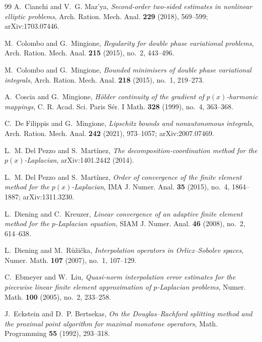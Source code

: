\documentclass[11pt]{amsart}
\theoremstyle{definition}
\theoremstyle{remark}
\numberwithin{equation}{section}
\begin{document}
\begin{thebibliography}{99}
A.~Cianchi and V.~G. Maz'ya, \emph{Second-order two-sided estimates in nonlinear elliptic problems}, Arch. Ration. Mech. Anal. \textbf{229} (2018), 569--599; arXiv:1703.07446.

M.~Colombo and G.~Mingione, \emph{Regularity for double phase variational problems}, Arch. Ration. Mech. Anal. \textbf{215} (2015), no.~2, 443--496.

M.~Colombo and G.~Mingione, \emph{Bounded minimisers of double phase variational integrals}, Arch. Ration. Mech. Anal. \textbf{218} (2015), no.~1, 219--273.

A.~Coscia and G.~Mingione, \emph{H\"older continuity of the gradient of $p(x)$-harmonic mappings}, C. R. Acad. Sci. Paris S\'er. I Math. \textbf{328} (1999), no.~4, 363--368.

C.~De Filippis and G.~Mingione, \emph{Lipschitz bounds and nonautonomous integrals}, Arch. Ration. Mech. Anal. \textbf{242} (2021), 973--1057; arXiv:2007.07469.

L.~M. Del Pezzo and S.~Mart\'inez, \emph{The decomposition-coordination method for the $p(x)$-Laplacian}, arXiv:1401.2442 (2014).

L.~M. Del Pezzo and S.~Mart\'inez, \emph{Order of convergence of the finite element method for the $p(x)$-Laplacian}, IMA J. Numer. Anal. \textbf{35} (2015), no.~4, 1864--1887; arXiv:1311.3230.

L.~Diening and C.~Kreuzer, \emph{Linear convergence of an adaptive finite element method for the $p$-Laplacian equation}, SIAM J. Numer. Anal. \textbf{46} (2008), no.~2, 614--638.

L.~Diening and M.~R\r{u}\v{z}i\v{c}ka, \emph{Interpolation operators in Orlicz--Sobolev spaces}, Numer. Math. \textbf{107} (2007), no.~1, 107--129.

C.~Ebmeyer and W.~Liu, \emph{Quasi-norm interpolation error estimates for the piecewise linear finite element approximation of $p$-Laplacian problems}, Numer. Math. \textbf{100} (2005), no.~2, 233--258.

J.~Eckstein and D.~P. Bertsekas, \emph{On the Douglas--Rachford splitting method and the proximal point algorithm for maximal monotone operators}, Math. Programming \textbf{55} (1992), 293--318.


\end{thebibliography}
\end{document}
